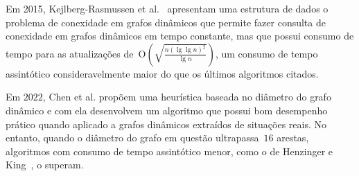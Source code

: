 Em 2015, Kejlberg-Rasmussen et al.~\cite{kejlbergrasmussen_et_al} apresentam uma estrutura de dados o problema de conexidade em grafos dinâmicos que permite fazer consulta de conexidade em grafos dinâmicos em tempo constante, mas que possui consumo de tempo para as atualizações de~$\mathrm{O}\left(\sqrt{\frac{n\left(\lg \lg n\right)^2}{\lg n}}\right)$, um consumo de tempo assintótico consideravelmente maior do que os últimos algoritmos citados.

Em $2022$, Chen et al. \cite{QC22} propõem uma heurística baseada no diâmetro do grafo dinâmico e com ela desenvolvem um algoritmo que possui bom desempenho prático quando aplicado a grafos dinâmicos extraídos de situações reais.
No entanto, quando o diâmetro do grafo em questão ultrapassa~$16$ arestas, algoritmos com consumo de tempo assintótico menor, como o de Henzinger e King~\cite{HenzingerKing}, o superam.

\begin{comment}
Em $2022$, Bader e Burkhardt~\cite{simpleAndEfficient2022} introduzem a primeira solução eficiente para um problema tangente ao de MSF. Neste problema, dado um grafo ponderado com $n$ vértices e $m$ arestas e uma dada MSF dele, é quisto encontrar, para cada aresta da MSF, uma aresta que a substituiria em caso de sua remoção. O consumo de tempo dessa solução é~$\O{m+n}$.
\end{comment}
